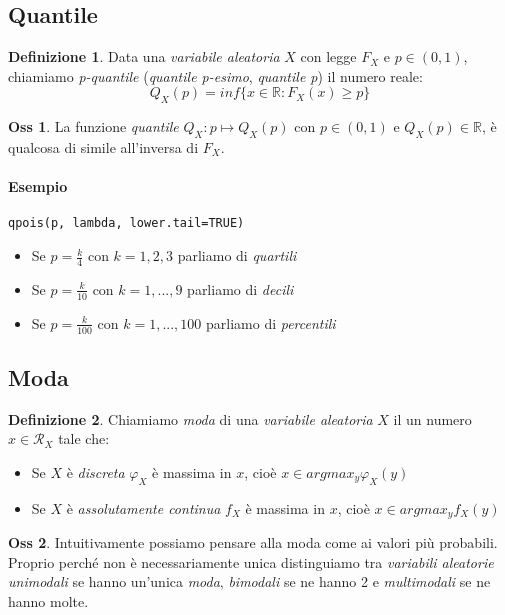 \documentclass[12pt, a4paper]{report}
\theoremstyle{definition}
\newtheorem{definition}{Definizione}[section]
\newtheorem*{observation}{Oss}
\DeclareRobustCommand{\R}{\mathbb{R}}%
\DeclareRobustCommand{\supp}{\mathcal{R}}%
\begin{document}
\subsection{Quantile}
\begin{definition}
	Data una \emph{variabile aleatoria} $X$ con legge $F_X$ e $p\in(0,1)$, chiamiamo
	\emph{p-quantile} (\emph{quantile p-esimo}, \emph{quantile p}) il numero reale:
	\[Q_X(p)=inf\{x\in\R:F_X(x)\geq p\}\]
\end{definition}

\begin{observation}
	La funzione \emph{quantile} \(Q_X:p\mapsto Q_X(p)\) con \(p\in(0,1)\) e \(Q_X(p)
	\in\R\), è qualcosa di simile all'inversa di $F_X$.
\end{observation}

\paragraph*{Esempio}
\texttt{qpois(p, lambda, lower.tail=TRUE)}
\begin{itemize}
	\item Se $p=\frac{k}{4}$ con \(k=1,2,3\) parliamo di \emph{quartili}
	\item Se $p=\frac{k}{10}$ con \(k=1,...,9\) parliamo di \emph{decili}
	\item Se $p=\frac{k}{100}$ con \(k=1,...,100\) parliamo di \emph{percentili}
\end{itemize}

\subsection{Moda}
\begin{definition}
	Chiamiamo \emph{moda} di una \emph{variabile aleatoria} $X$ il un numero
	$x\in\supp_X$ tale che:
	\begin{itemize}
		\item Se $X$ è \emph{discreta} $\varphi_X$ è massima in $x$, cioè \(x\in
		argmax_y\varphi_X(y)\)
		\item Se $X$ è \emph{assolutamente continua} $f_X$ è massima in $x$, cioè
		\(x\in argmax_y f_X(y)\)
	\end{itemize}
\end{definition}

\begin{observation}
	Intuitivamente possiamo pensare alla moda come ai valori più probabili.
	Proprio perché non è necessariamente unica distinguiamo tra \emph{variabili
	aleatorie unimodali} se hanno un'unica \emph{moda}, \emph{bimodali} se ne
	hanno 2 e \emph{multimodali} se ne hanno molte.
\end{observation}
\end{document}
